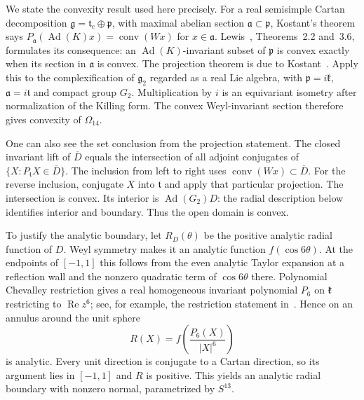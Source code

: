 \documentclass[11pt]{amsart}
\theoremstyle{remark}
\numberwithin{equation}{section}
\newcommand{\Ad}{\operatorname{Ad}}
\newcommand{\re}{\operatorname{Re}}
\newcommand{\kf}{\mathfrak k}
\newcommand{\tf}{\mathfrak t}
\begin{document}
We state the convexity result used here precisely. For a real
semisimple Cartan decomposition $\mathfrak g=\mathfrak t_c\oplus
\mathfrak p$, with maximal abelian section $\mathfrak a\subset
\mathfrak p$, Kostant's theorem says
$P_{\mathfrak a}(\Ad(K)x)=\operatorname{conv}(Wx)$ for
$x\in\mathfrak a$. Lewis~\cite{Lewis2000}, Theorems~2.2 and~3.6,
formulates its consequence: an $\Ad(K)$-invariant subset of
$\mathfrak p$ is convex exactly when its section in $\mathfrak a$
is convex. The projection theorem is due to
Kostant~\cite{Kostant1973}. Apply this to the complexification of
$\mathfrak g_2$ regarded as a real Lie algebra, with
$\mathfrak p=i\kf$, $\mathfrak a=i\tf$ and compact group $G_2$.
Multiplication by $i$ is an equivariant isometry after normalization
of the Killing form. The convex Weyl-invariant section therefore
gives convexity of $\Omega_{14}$.

One can also see the set conclusion from the projection statement.
The closed invariant lift of $\overline D$ equals the intersection
of all adjoint conjugates of
$\{X:P_\tf X\in\overline D\}$. The inclusion from left to right uses
$\operatorname{conv}(Wx)\subset\overline D$. For the reverse inclusion,
conjugate $X$ into $\tf$ and apply that particular projection.
The intersection is convex. Its interior is $\Ad(G_2)D$: the radial
description below identifies interior and boundary. Thus the open
domain is convex.

To justify the analytic boundary, let $R_D(\theta)$ be the positive
analytic radial function of $D$. Weyl symmetry makes it an analytic
function $f(\cos6\theta)$. At the endpoints of $[-1,1]$ this follows
from the even analytic Taylor expansion at a reflection wall and
the nonzero quadratic term of $\cos6\theta$ there. Polynomial
Chevalley restriction gives a real homogeneous invariant polynomial
$P_6$ on $\kf$ restricting to $\re z^6$; see, for example, the
restriction statement in~\cite{Tevelev1999}. Hence on an annulus
around the unit sphere
\[
 R(X)=f\left(\frac{P_6(X)}{|X|^6}\right)
\]
is analytic. Every unit direction is conjugate to a Cartan direction,
so its argument lies in $[-1,1]$ and $R$ is positive.
This yields an analytic radial boundary with nonzero normal,
parametrized by $S^{13}$.
\end{document}

